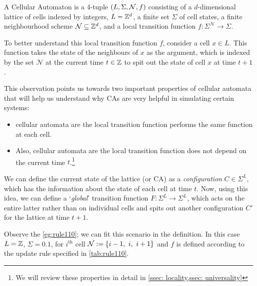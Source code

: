 \documentclass[11pt, oneside, listof=totoc]{scrbook}
\begin{document}
\begin{definition}
    A Cellular Automaton is a 4-tuple \(\qty(L, \Sigma, \mathcal{N}, f)\) consisting of a $d$-dimensional lattice of cells indexed by integers, $L = \mathbb Z^d$, a finite set $\Sigma$ of cell states, a finite neighbourhood scheme $\mathcal{N} \subseteq \mathbb Z^d$, and a local transition function $f: \Sigma^{\mathcal{N}} \to \Sigma$.
\end{definition}

To better understand this local transition function \(f\), consider a cell \(x \in L\). This function takes the state of the neighbours of \(x\) as the argument, which is indexed by the set \(\mathcal{N}\) at the current time \(t \in \mathbb Z\) to spit out the state of cell $x$ at time $t + 1$.

\noindent This observation points us towards two important properties of cellular automata that will help us understand why CAs are very helpful in simulating certain systems:

\begin{itemize}
    \item cellular automata are  \ie the local transition function performs the same function at each cell.
    \item Also, cellular automata are  \ie the local transition function does not depend on the current time $t$.\footnote{We will review these properties in detail in \cref{ssec: locality,ssec: universality}}
\end{itemize}

\noindent We can define the current state of the lattice (or CA) as a \emph{configuration} \(C \in \Sigma^{L}\), which has the information about the state of each cell at time \(t\). Now, using this idea, we can define a `\emph{global}' transition function \(F: \Sigma^{L} \to \Sigma^{L}\), which acts on the entire latter rather than on individual cells and spits out another configuration \(C'\) for the lattice at time \(t+1\).

\begin{remark}
    Observe the \cref{eg:rule110}; we can fit this scenario in the definition. In this case \(L = \mathbb Z\), \(\Sigma = \qty{0, 1}\), for $i^{\text{th}}$ cell \(\mathcal{N} := \qty{i-1,~ i,~ i+1}\) and \(f\) is defined according to the update rule specified in \cref{tab:rule110}.
\end{remark}
\end{document}
